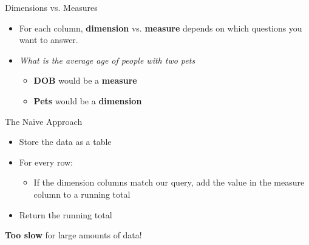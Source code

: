 \documentclass{beamer}
\theoremstyle{definition}
\theoremstyle{definition}
\begin{document}
\begin{frame}{Dimensions vs. Measures}
    \begin{itemize}
        \item For each column, \textbf{dimension} vs. \textbf{measure} depends on which questions you want to answer.
        \item \textit{What is the average age of people with two pets}
        \begin{itemize}
            \item \textbf{DOB} would be a \textbf{measure}
            \item \textbf{Pets} would be a \textbf{dimension}
        \end{itemize}
    \end{itemize}
\end{frame}

\begin{frame}{The Na\"{i}ve Approach}
    \begin{itemize}
        \item Store the data as a table
        \item For every row:
        \begin{itemize}
            \item If the dimension columns match our query, add the value in the measure column to a running total
        \end{itemize}
        \item Return the running total
    \end{itemize}
    \textbf{Too slow} for large amounts of data!
\end{frame}
\end{document}
